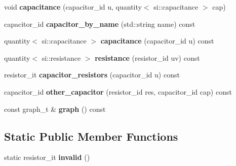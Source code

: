 \begin{DoxyCompactItemize}
\item 
\hypertarget{classophidian_1_1interconnection_1_1rc__tree_a4db2106df9ff03422a9efa996d9dabfe}{void {\bfseries capacitance} (capacitor\-\_\-id u, quantity$<$ si\-::capacitance $>$ cap)}\label{classophidian_1_1interconnection_1_1rc__tree_a4db2106df9ff03422a9efa996d9dabfe}

\item 
\hypertarget{classophidian_1_1interconnection_1_1rc__tree_a27d52641b61ecb5722f5c9f7e183f674}{capacitor\-\_\-id {\bfseries capacitor\-\_\-by\-\_\-name} (std\-::string name) const }\label{classophidian_1_1interconnection_1_1rc__tree_a27d52641b61ecb5722f5c9f7e183f674}

\item 
\hypertarget{classophidian_1_1interconnection_1_1rc__tree_a4b3aad5a72af43566289e6de214ace50}{quantity$<$ si\-::capacitance $>$ {\bfseries capacitance} (capacitor\-\_\-id u) const }\label{classophidian_1_1interconnection_1_1rc__tree_a4b3aad5a72af43566289e6de214ace50}

\item 
\hypertarget{classophidian_1_1interconnection_1_1rc__tree_a15276013af4bb7283f62656531ffecfb}{quantity$<$ si\-::resistance $>$ {\bfseries resistance} (resistor\-\_\-id uv) const }\label{classophidian_1_1interconnection_1_1rc__tree_a15276013af4bb7283f62656531ffecfb}

\item 
\hypertarget{classophidian_1_1interconnection_1_1rc__tree_a1c296a5067234cb99ce6a8ca1f085c75}{resistor\-\_\-it {\bfseries capacitor\-\_\-resistors} (capacitor\-\_\-id u) const }\label{classophidian_1_1interconnection_1_1rc__tree_a1c296a5067234cb99ce6a8ca1f085c75}

\item 
\hypertarget{classophidian_1_1interconnection_1_1rc__tree_a612ffed536ea1fbaf6e7574f4e0a6531}{capacitor\-\_\-id {\bfseries other\-\_\-capacitor} (resistor\-\_\-id res, capacitor\-\_\-id cap) const }\label{classophidian_1_1interconnection_1_1rc__tree_a612ffed536ea1fbaf6e7574f4e0a6531}

\item 
\hypertarget{classophidian_1_1interconnection_1_1rc__tree_a52102a355b292bca74f6494663c477e8}{const graph\-\_\-t \& {\bfseries graph} () const }\label{classophidian_1_1interconnection_1_1rc__tree_a52102a355b292bca74f6494663c477e8}

\end{DoxyCompactItemize}
\subsection*{Static Public Member Functions}
\begin{DoxyCompactItemize}
\item 
\hypertarget{classophidian_1_1interconnection_1_1rc__tree_aa4187806724136382911946a0112ccf4}{static resistor\-\_\-it {\bfseries invalid} ()}\label{classophidian_1_1interconnection_1_1rc__tree_aa4187806724136382911946a0112ccf4}

\end{DoxyCompactItemize}


